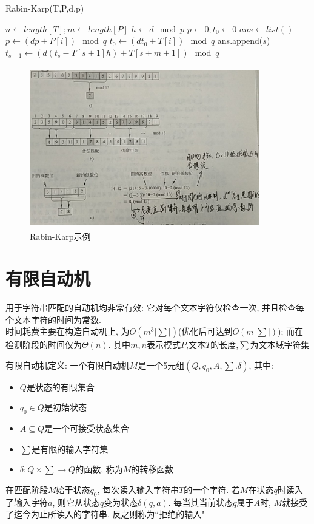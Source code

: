 \begin{algorithm}[htbp]
    \caption{Rabin-Karp(T,P,d,p)}
    \label{alg:rabin-karp}
    \begin{algorithmic}[1] %
        \STATE $n \leftarrow length[T]; m \leftarrow length[P]$
        \STATE $h \leftarrow d \mod p$
        \STATE $p \leftarrow 0; t_0 \leftarrow 0$
        \STATE $ans \leftarrow list()$
            \STATE $p \leftarrow (dp + P[i]) \mod q$
            \STATE $t_0 \leftarrow (dt_0 + T[i]) \mod q$
        \ENDFOR
                    \STATE ans.append($s$)
                \ENDIF
            \ENDIF
                \STATE $t_{s+1} \leftarrow (d(t_s-T[s+1]h)+T[s+m+1]) \mod q$
            \ENDIF
        \ENDFOR
    \end{algorithmic}
\end{algorithm}

\begin{figure}[htbp]
    \centering
    \includegraphics[height=7cm,width=10cm]{notes/algorithm/pic/Rabin-Karp.png}
    \caption{Rabin-Karp示例}
\end{figure}


\section*{有限自动机}
用于字符串匹配的自动机均非常有效: 它对每个文本字符仅检查一次, 并且检查每个文本字符的时间为常数. \\
时间耗费主要在构造自动机上, 为$O(m^3|\sum|)$(优化后可达到$O(m|\sum|)$); 而在检测阶段的时间仅为$\Theta(n)$. 其中$m,n$表示模式$P$,文本$T$的长度,$\sum$为文本域字符集

有限自动机定义: 一个有限自动机$M$是一个5元组$(Q,q_0,A,\sum.\delta)$, 其中:
\begin{itemize}
\item $Q$是状态的有限集合
\item $q_0 \in Q$是初始状态
\item $A \subseteq Q$是一个可接受状态集合
\item $\sum$是有限的输入字符集
\item $\delta: Q×\sum \to Q$的函数, 称为$M$的转移函数
\end{itemize}
在匹配阶段$M$始于状态$q_0$, 每次读入输入字符串$T$的一个字符. 若$M$在状态$q$时读入了输入字符$a$, 则它从状态$q$变为状态$\delta(q,a)$. 每当其当前状态$q$属于$A$时, $M$就接受了迄今为止所读入的字符串, 反之则称为``拒绝的输入"

